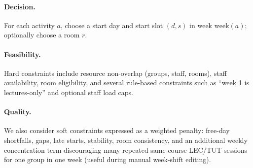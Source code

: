 \paragraph{Decision.}
For each activity $a$, choose a start day and start slot $(d,s)$ in week $\mathrm{week}(a)$; optionally choose a room $r$.

\paragraph{Feasibility.}
Hard constraints include resource non-overlap (groups, staff, rooms), staff availability, room eligibility, and several rule-based constraints such as ``week 1 is lectures-only'' and optional staff load caps.

\paragraph{Quality.}
We also consider soft constraints expressed as a weighted penalty:
free-day shortfalls, gaps, late starts, stability, room consistency,
and an additional weekly concentration term discouraging many repeated
same-course LEC/TUT sessions for one group in one week (useful during manual week-shift editing).
